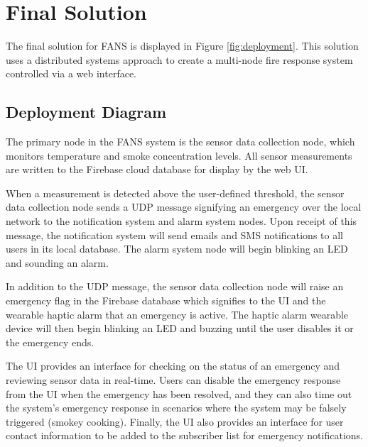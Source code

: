 \section{Final Solution}

The final solution for FANS is displayed in Figure \ref{fig:deployment}. This solution uses a distributed systems
approach to create a multi-node fire response system controlled via a web interface.

\subsection{Deployment Diagram}

The primary node in the FANS system is the sensor data collection node, which monitors temperature and smoke
concentration levels. All sensor measurements are written to the Firebase cloud database for display by the web UI.

When a measurement is detected above the user-defined threshold, the sensor data collection node sends a UDP message
signifying an emergency over the local network to the notification system and alarm system nodes. Upon receipt of this
message, the notification system will send emails and SMS notifications to all users in its local database. The alarm
system node will begin blinking an LED and sounding an alarm.

In addition to the UDP message, the sensor data collection node will raise an emergency flag in the Firebase database
which signifies to the UI and the wearable haptic alarm that an emergency is active. The haptic alarm wearable device
will then begin blinking an LED and buzzing until the user disables it or the emergency ends.

The UI provides an interface for checking on the status of an emergency and reviewing sensor data in real-time. Users
can disable the emergency response from the UI when the emergency has been resolved, and they can also time out the
system’s emergency response in scenarios where the system may be falsely triggered (smokey cooking). Finally, the UI
also provides an interface for user contact information to be added to the subscriber list for emergency notifications.

